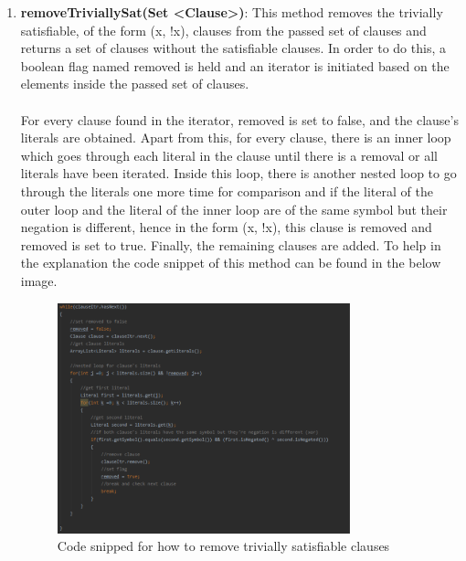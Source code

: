 \documentclass{article}
\begin{document}
		\begin{enumerate}
		\item \textbf{removeTriviallySat(Set \textless Clause\textgreater)}: This method removes the trivially satisfiable, of the form (x, !x), clauses from the passed set of clauses and returns a set of clauses without the satisfiable clauses. In order to do this, a boolean flag named removed is held and an iterator is initiated based on the elements inside the passed set of clauses. 
		\\\\
		For every clause found in the iterator, removed is set to false, and the clause's literals are obtained. Apart from this, for every clause, there is an inner loop which goes through each literal in the clause until there is a removal or all literals have been iterated. Inside this loop, there is another nested loop to go through the literals one more time for comparison and if the literal of the outer loop and the literal of the inner loop are of the same symbol but their negation is different, hence in the form (x, !x), this clause is removed and removed is set to true. Finally, the remaining clauses are added. To help in the explanation the code snippet of this method can be found in the below image.
		
								\begin{figure}[H]
					\centering
			 			\includegraphics[width=0.8\textwidth]{removesat.png}
			 			\centering
			  			\caption{Code snipped for how to remove trivially satisfiable clauses}
			  			\label{fig:removesat}
					\end{figure}
		

\end{enumerate}
\end{document}
